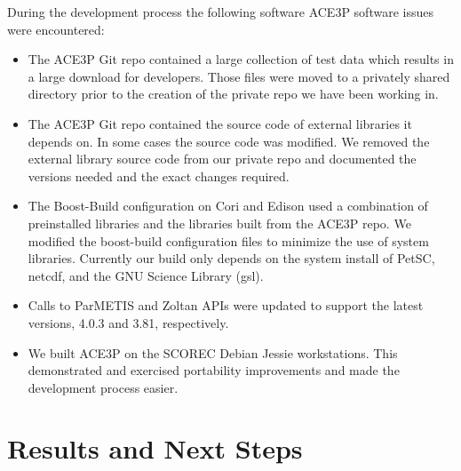 \documentclass[a4paper]{article}
\begin{document}
During the development process the following software ACE3P software issues were
encountered:
\begin{itemize}
  \item The ACE3P Git repo contained a large collection of test data which
    results in a large download for developers.  Those files were moved to a
    privately shared directory prior to the creation of the private repo we have 
    been working in.
  \item The ACE3P Git repo contained the source code of
    external libraries it depends on.  In some cases the source code was modified.  
    We removed the external library source code from our private repo and documented 
    the versions needed and the exact changes required.
  \item The Boost-Build configuration on Cori and Edison used a combination 
    of preinstalled libraries and the libraries built from the ACE3P repo. We
    modified the boost-build configuration files to minimize the use of system
    libraries. Currently our build only depends on the system install of PetSC,
    netcdf, and the GNU Science Library (gsl).
  \item Calls to ParMETIS and Zoltan APIs were updated to support the latest
    versions, 4.0.3 and 3.81, respectively.
  \item We built ACE3P on the SCOREC Debian Jessie workstations.  This demonstrated 
    and exercised portability improvements and made the development process
    easier.
\end{itemize}

\section{Results and Next Steps}\label{sec:results}
\end{document}
